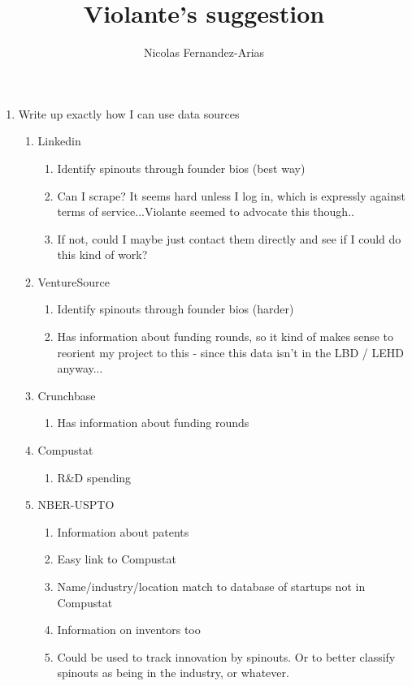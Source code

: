 \documentclass[12pt,english]{article}
\theoremstyle{remark}
\begin{document}
	
\title{Violante's suggestion}
\author{Nicolas Fernandez-Arias}
\maketitle

\begin{enumerate}
	\item Write up exactly how I can use data sources
	\begin{enumerate}
		\item Linkedin
		\begin{enumerate}
			\item Identify spinouts through founder bios (best way)
			\item Can I scrape? It seems hard unless I log in, which is expressly against terms of service...Violante seemed to advocate this though..
			\item If not, could I maybe just contact them directly and see if I could do this kind of work? 
		\end{enumerate}
		\item VentureSource
		\begin{enumerate}
			\item Identify spinouts through founder bios (harder)
			\item Has information about funding rounds, so it kind of makes sense to reorient my project to this - since this data isn't in the LBD / LEHD anyway...
		\end{enumerate}
		\item Crunchbase
		\begin{enumerate}
			\item Has information about funding rounds
		\end{enumerate}
		\item Compustat
		\begin{enumerate}
			\item R&D spending
		\end{enumerate}
		\item NBER-USPTO
		\begin{enumerate}
			\item Information about patents
			\item Easy link to Compustat 
			\item Name/industry/location match to database of startups not in Compustat
			\item Information on inventors too
			\item Could be used to track innovation by spinouts. Or to better classify spinouts as being in the industry, or whatever. 
		\end{enumerate}
	\end{enumerate}
\end{enumerate}
\end{document}
